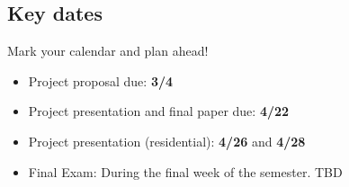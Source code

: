\documentclass[11pt,article,oneside]{memoir} %
\begin{document}
\subsection{Key dates}\label{sub:key_dates} %

Mark your calendar and plan ahead!

\vspace{-10pt}
\begin{itemize}\itemsep=0pt%
\item Project proposal due: \textbf{3/4}
\item Project presentation and final paper due: \textbf{4/22}
\item Project presentation (residential): \textbf{4/26} and \textbf{4/28} 
\item Final Exam: During the final week of the semester. TBD
\end{itemize} %





\end{document}
